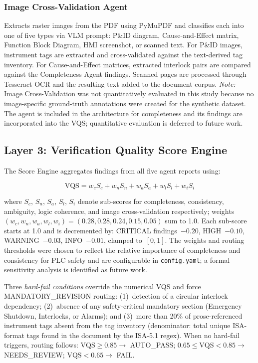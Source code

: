 \documentclass[journal]{IEEEtran}
\begin{document}
\subsubsection{Image Cross-Validation Agent}
Extracts raster images from the PDF using PyMuPDF and classifies each into one
of five types via VLM prompt: P\&ID diagram, Cause-and-Effect matrix, Function
Block Diagram, HMI screenshot, or scanned text. For P\&ID images, instrument
tags are extracted and cross-validated against the text-derived tag inventory.
For Cause-and-Effect matrices, extracted interlock pairs are compared against
the Completeness Agent findings. Scanned pages are processed through Tesseract
OCR and the resulting text added to the document corpus.
\textit{Note:} Image Cross-Validation was not quantitatively evaluated in this
study because no image-specific ground-truth annotations were created for the
synthetic dataset. The agent is included in the architecture for completeness
and its findings are incorporated into the VQS; quantitative evaluation is
deferred to future work.

\subsection{Layer 3: Verification Quality Score Engine}

The Score Engine aggregates findings from all five agent reports using:

\begin{equation}
\text{VQS} = w_c S_c + w_n S_n + w_a S_a + w_l S_l + w_i S_i
\label{eq:vqs}
\end{equation}

\noindent where $S_c$, $S_n$, $S_a$, $S_l$, $S_i$ denote sub-scores for
completeness, consistency, ambiguity, logic coherence, and image cross-validation
respectively; weights $(w_c,w_n,w_a,w_l,w_i) = (0.28,0.28,0.24,0.15,0.05)$
sum to 1.0. Each sub-score starts at 1.0 and is decremented by: CRITICAL
findings~$-0.20$, HIGH~$-0.10$, WARNING~$-0.03$, INFO~$-0.01$, clamped
to~$[0,1]$. The weights and routing thresholds were chosen to reflect the
relative importance of completeness and consistency for PLC safety and are
configurable in \texttt{config.yaml}; a formal sensitivity analysis is
identified as future work.

Three \textit{hard-fail conditions} override the numerical VQS and force
MANDATORY\_REVISION routing: (1)~detection of a circular interlock dependency;
(2)~absence of any safety-critical mandatory section (Emergency Shutdown,
Interlocks, or Alarms); and (3)~more than 20\% of prose-referenced instrument
tags absent from the tag inventory (denominator: total unique ISA-format tags
found in the document by the ISA-5.1 regex). When no hard-fail triggers, routing
follows: $\text{VQS}\geq 0.85 \to$ AUTO\_PASS; $0.65\leq\text{VQS}<0.85 \to$
NEEDS\_REVIEW; $\text{VQS}<0.65 \to$ FAIL.
\end{document}
